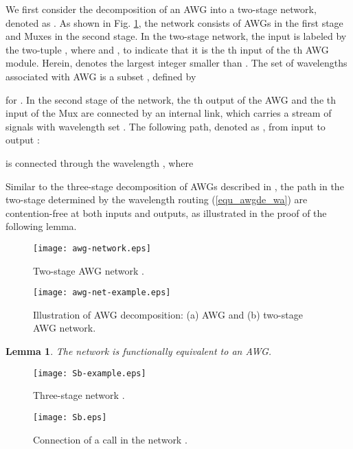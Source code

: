 \documentclass[journal]{IEEEtran}
\newtheorem{lemma}{\textbf{Lemma}}
\begin{document}
We first consider the decomposition of an  AWG into
a two-stage network, denoted as . As
shown in Fig. \ref{f_awg-network}, the network consists of 
 AWGs in the first stage and   Muxes
in the second stage. In the two-stage network, the input  is
labeled by the two-tuple , where 
and , to indicate that it is the th input of the
th AWG module. Herein,  denotes the largest
integer smaller than . The set of wavelengths associated with AWG
 is a subset , defined by

for . In the second stage of the network,
the th output of the AWG  and the th input of the Mux
 are connected by an internal link, which carries a stream
of signals with wavelength set . The following path,
denoted as , from input  to output :
\setlength{\arraycolsep}{0.1em}

is connected through the wavelength
, where \setlength{\arraycolsep}{0.1em}

Similar to the three-stage decomposition of AWGs described in
\cite{Ye:JLT2012}, the path  in the two-stage
 determined by the wavelength routing
(\ref{equ_awgde_wa}) are contention-free at both inputs and outputs,
as illustrated in the proof of the following lemma.

\begin{figure}[t]
\centering
\texttt{[image: awg-network.eps]}
\caption{Two-stage AWG network
.}\label{f_awg-network}
\end{figure}

\begin{figure}[t]
\centering
\texttt{[image: awg-net-example.eps]}
\caption{Illustration of AWG decomposition: (a)  AWG and
(b)  two-stage AWG network.}\label{f_awg-net-example}
\end{figure}

\begin{lemma}\label{lemma_awgde}
The network  is functionally equivalent
to an  AWG.
\end{lemma}

\begin{figure*}[t]
\centering
\texttt{[image: Sb-example.eps]}
\caption{Three-stage network
.}\label{f_Sb-example}
\end{figure*}

\begin{figure*}[t]
\centering
\texttt{[image: Sb.eps]}
\caption{Connection of a call 
in the network .}\label{f_Sb}
\end{figure*}
\end{document}
